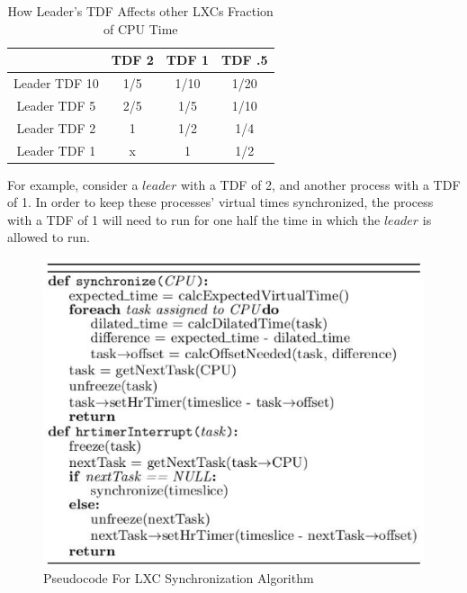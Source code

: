 \begin{table} \centering 
\begin{tabular}{|c|c|c|c|} 
        \hline 
         & TDF 2 & TDF 1 & TDF .5  \\ \hline 
        Leader TDF 10 & 1/5 & 1/10 &  1/20 \\ \hline 
        Leader TDF 5 &  2/5 & 1/5 & 1/10 \\ \hline 
        Leader TDF 2 & 1 & 1/2 & 1/4 \\ \hline 
        Leader TDF 1 & x &  1 & 1/2 \\ \hline 
        \hline 
        \end{tabular} 
        \caption{How Leader's TDF Affects other LXCs Fraction of CPU Time} 
        \label{table:cpufraction} 
\end{table}
For example, consider a $leader$ with a TDF of 2, and another process with a TDF of 1. In order to keep these processes' virtual times synchronized, the process with a TDF of 1 will need to run for one half the time in which the $leader$ is allowed to run. 
\begin{figure}[t] 
      \includegraphics[width=.9\textwidth]{images/synchronization_alg.eps} 
    \caption{Pseudocode For LXC Synchronization Algorithm } 
    \label{fig:synchronization_alg} 
  \end{figure} 
